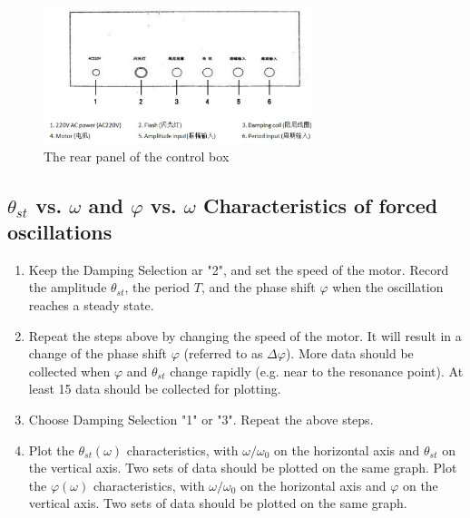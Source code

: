 \begin{figure}[H]
\centering
\includegraphics[width=0.7\textwidth]{fig/es4}
\caption{The rear panel of the control box}\label{real}
\end{figure}

\subsection{$\theta_{st}$ vs. $\omega$ and $\varphi$ vs. $\omega$
  Characteristics of forced oscillations} 

\begin{enumerate}
\item Keep the Damping Selection ar "2", and set the speed of the motor. Record
  the amplitude $\theta_{st}$, the period $T$, and the phase shift $\varphi$
  when the oscillation reaches a steady state. 
\item Repeat the steps above by changing the speed of the motor. It will result
  in a change of the phase shift $\varphi$ (referred to as $\Delta \varphi$).
  More data should be collected when $\varphi$ and $\theta_{st}$ change rapidly
  (e.g. near to the resonance point). At least 15 data should be collected for
  plotting.  
\item Choose Damping Selection "1" or "3". Repeat the above steps.
\item Plot the $\theta_{st} (\omega)$ characteristics, with $\omega/\omega_0$ on
  the horizontal axis and $\theta_{st}$ on the vertical axis. Two sets of data
  should be plotted on the same graph. 
Plot the $\varphi (\omega)$ characteristics, with $\omega/\omega_0$ on the
horizontal axis and $\varphi$ on the vertical axis. Two sets of data should be
plotted on the same graph. 
\end{enumerate}


